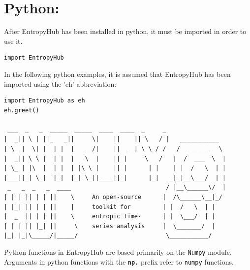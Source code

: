 \documentclass[12pt, a4paper, titlepage, openany]{book}
\begin{document}
\section{Python:}
\noindent After EntropyHub has been installed in python, it must be imported in order to use it.
\begin{verbatim}
import EntropyHub
\end{verbatim}
\noindent In the following python examples, it is assumed that EntropyHub has been imported using the 'eh' abbreviation:
\begin{verbatim}
import EntropyHub as eh
eh.greet()

 ___  _   _  _____  _____  ____  ____  _     _          
|  _|| \ | ||_   _||     \|    ||    || \   / |   ___________ 
| \_ |  \| |  | |  |   __/|    ||  __| \ \_/ /   /  _______  \
|  _|| \ \ |  | |  |   \  |    || |     \   /   |  /  ___  \  |
| \_ | |\  |  | |  | |\ \ |    || |      | |    | |  /   \  | | 
|___||_| \_|  |_|  |_| \_||____||_|      |_|   _|_|__\___/  | | 
 _   _  _   _  ____                           / |__\______\/  | 
| | | || | | ||    \     An open-source      |  /\______\__|_/ 
| |_| || | | ||    |     toolkit for         | |  /   \  | | 
|  _  || | | ||    \     entropic time-      | |  \___/  | |          
| | | || |_| ||     \    series analysis     |  \_______/  |
|_| |_|\_____/|_____/                         \___________/ 

\end{verbatim}


\begin{tcolorbox}[sharp corners, colback=ehone!30, colframe=ehone, title=\textbf{NOTE}]
Python functions in EntropyHub are based primarily on the \texttt{Numpy} module.\\ Arguments in python functions with the \textbf{\texttt{np.}} prefix refer to \texttt{numpy} functions.  
\end{tcolorbox}


\newpage
\end{document}
